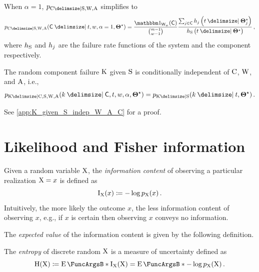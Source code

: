 \documentclass[
    11pt,
    extrafontsizes,
    article,
    oldfontcommands,
    final,
    oneside,
    openany,
    hidelinks]{memoir}
\begin{document}
\begin{corollary}
\label{def:general_cond_cand_probability}
When $\alpha=1$, $\pmf_{\rvcand \Given \sv, \RV{W}, \RV{A}}$ simplifies to 
\begin{equation}
\label{eq:general_cond_cand_probability}
\pmf_{\rvcand \Given \sv, \RV{W}, \RV{A}}(\cand \Given t, w, \alpha=1, \tparam\sysparam) =
\frac{\SetIndicator{\candsw{w}}(\cand)}{\binom{m-1}{w-1}}
\frac
{
	\sum_{j \in \cand} \haz_j\left(t \Given \tparam\sysparam_j\right)
}
{
	\haz_{\sv}\left(t \Given \tparam\sysparam\right)
}\,,
\end{equation}
where $h_{\mathrm{S}}$ and $h_j$ are the failure rate functions of the system 
and the \jth component respectively.
\end{corollary}




\begin{corollary}
\label{cor:K_given_S_indep_W_A_C}
The random component failure $\mathrm{K}$ given $\mathrm{S}$ is conditionally independent of $\mathrm{C}$, $\mathrm{W}$, and $\mathrm{A}$, i.e.,
\begin{equation}
	\pmf_{\RV{K} \Given \rvcand, \sv, \RV{W}, \RV{A}}(k \Given \cand, t, w, \alpha, \tparam\sysparam) = \pmf_{\RV{K} \Given \sv}(k \Given t, \tparam\sysparam)\,.
\end{equation}
\end{corollary}
See \cref{app:K_given_S_indep_W_A_C} for a proof.


\chapter{Likelihood and Fisher information}
\label{sec:general_fisher_info}
Given a random variable $\mathrm{X}$, the \emph{information content} of observing a particular realization $\mathrm{X} = x$ is defined as
\begin{equation}
\operatorname{I}_{\mathrm{X}}(x) \coloneqq -\log p_{\mathrm{X}}(x)\,.
\end{equation}
Intuitively, the more likely the outcome $x$, the less information content of observing $x$, e.g., if $x$ is certain then observing $x$ conveys no information.

The \emph{expected value} of the information content is given by the following definition.
\begin{definition}
The \emph{entropy} of discrete random $\mathrm{X}$ is a measure of uncertainty defined as
\begin{equation}
\entropy(\RV{X}) \coloneqq \Expect{\info_{\RV{X}}(\RV{X})} = \Expect{- \log \pmf_{\RV{X}}(\RV{X})}\,.
\end{equation}
\end{definition}
\end{document}
